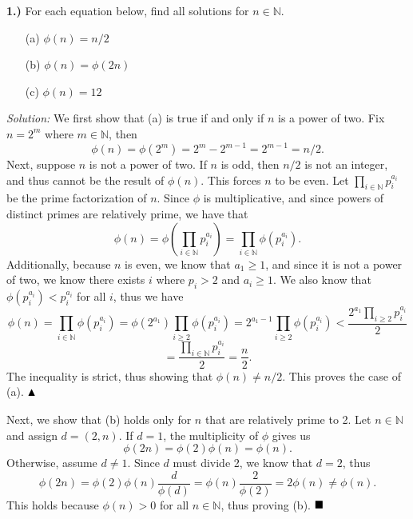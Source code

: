 \documentclass[12pt]{article}
\newcommand{\N}{\ensuremath{\mathbb{N}}}
\newcommand{\parenb}[1]{\left(#1\right)}
\newcommand{\partialdone}{\ensuremath{\strut\hfill\blacktriangle}}
\newcommand{\done}{\ensuremath{\strut\hfill\blacksquare}}
\begin{document}
\pagestyle{fancy}

\setlength{\parindent}{0in}
\setlength{\parskip}{0.1in}

\textbf{1.)} For each equation below, find all solutions for \( n \in \N \).
\begin{itemize}
	\item [(a)] \( \phi(n) = n / 2 \)
	\item [(b)] \( \phi(n) = \phi(2n) \)
	\item [(c)] \( \phi(n) = 12 \)
\end{itemize}

\textit{Solution:}
We first show that (a) is true if and only if \( n \) is a power of two.
Fix \( n = 2^m \) where \( m \in \N \), then
\[
	\phi(n) = \phi(2^m) = 2^m - 2^{m - 1} = 2^{m - 1} = n / 2.
\]
Next, suppose \( n \) is not a power of two.
If \( n \) is odd, then \( n / 2 \) is not an integer, and thus cannot be the
result of \( \phi(n) \).
This forces \( n \) to be even.
Let \( \prod_{i \in \N} p_i^{a_i} \) be the prime factorization of \( n \).
Since \( \phi \) is multiplicative, and since powers of distinct primes are
relatively prime, we have that
\[
	\phi(n)
	= \phi\parenb{\prod_{i \in \N} p_i^{a_i}}
	= \prod_{i \in \N} \phi(p_i^{a_i}).
\]
Additionally, because \( n \) is even, we know that \( a_1 \geq 1 \), and since
it is not a power of two, we know there exists \( i \) where \( p_i > 2 \) and
\( a_i \geq 1 \).
We also know that \( \phi(p_i^{a_i}) < p_i^{a_i} \) for all \( i \), thus we
have
\[
	\phi(n)
	= \prod_{i \in \N} \phi(p_i^{a_i})
	= \phi(2^{a_1}) \prod_{i \geq 2} \phi(p_i^{a_i})
	= 2^{a_1 - 1} \prod_{i \geq 2} \phi(p_i^{a_i})
	< \frac{2^{a_1} \prod_{i \geq 2} p_i^{a_i}}{2}
\]
\[
	= \frac{\prod_{i \in \N} p_i^{a_i}}{2}
	= \frac{n}{2}.
\]
The inequality is strict, thus showing that \( \phi(n) \ne n/2 \).
This proves the case of (a).
\partialdone

Next, we show that (b) holds only for \( n \) that are relatively prime to 2.
Let \( n \in \N \) and assign \( d = (2,n) \).
If \( d = 1 \), the multiplicity of \( \phi \) gives us
\[
	\phi(2n)
	= \phi(2)\phi(n)
	= \phi(n).
\]
Otherwise, assume \( d \ne 1 \).
Since \( d \) must divide 2, we know that \( d = 2 \), thus
\[
	\phi(2n)
	= \phi(2)\phi(n)\frac{d}{\phi(d)}
	= \phi(n)\frac{2}{\phi(2)}
	= 2\phi(n)
	\ne \phi(n).
\]
This holds because \( \phi(n) > 0 \) for all \( n \in \N \), thus proving (b).
\done
\end{document}
